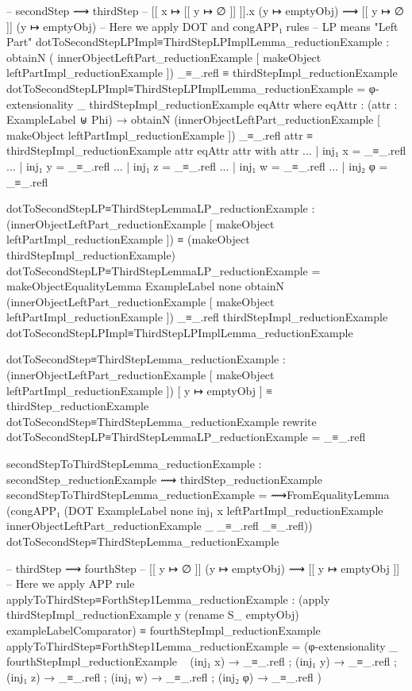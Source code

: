 -- secondStep ⟿ thirdStep
-- [[ x ↦ [[ y ↦ ∅ ]] ]].x (y ↦ emptyObj) ⟿ [[ y ↦ ∅ ]] (y ↦ emptyObj)
-- Here we apply DOT and congAPP₁ rules
-- LP means "Left Part"
dotToSecondStepLPImpl≡ThirdStepLPImplLemma_reductionExample :
  obtainN ( innerObjectLeftPart_reductionExample 
    [ makeObject leftPartImpl_reductionExample ])
  _≡_.refl ≡ thirdStepImpl_reductionExample
dotToSecondStepLPImpl≡ThirdStepLPImplLemma_reductionExample =
  φ-extensionality _ thirdStepImpl_reductionExample eqAttr where
    eqAttr : (attr : ExampleLabel ⊎ Phi)
      → obtainN (innerObjectLeftPart_reductionExample
        [ makeObject leftPartImpl_reductionExample ])
      _≡_.refl attr ≡ thirdStepImpl_reductionExample attr
    eqAttr attr with attr
    ... | inj₁ x = _≡_.refl
    ... | inj₁ y = _≡_.refl
    ... | inj₁ z = _≡_.refl
    ... | inj₁ w = _≡_.refl
    ... | inj₂ φ = _≡_.refl

dotToSecondStepLP≡ThirdStepLemmaLP_reductionExample :
  (innerObjectLeftPart_reductionExample
    [ makeObject leftPartImpl_reductionExample ])
  ≡ (makeObject thirdStepImpl_reductionExample)
dotToSecondStepLP≡ThirdStepLemmaLP_reductionExample =
  makeObjectEqualityLemma
    {ExampleLabel}
    {none}
    {obtainN
      (innerObjectLeftPart_reductionExample [ makeObject leftPartImpl_reductionExample ])
      _≡_.refl}
    {thirdStepImpl_reductionExample}
    dotToSecondStepLPImpl≡ThirdStepLPImplLemma_reductionExample

dotToSecondStep≡ThirdStepLemma_reductionExample :
  (innerObjectLeftPart_reductionExample
    [ makeObject leftPartImpl_reductionExample ])
  [ y ↦ emptyObj ]
  ≡ thirdStep_reductionExample
dotToSecondStep≡ThirdStepLemma_reductionExample
  rewrite dotToSecondStepLP≡ThirdStepLemmaLP_reductionExample = _≡_.refl

secondStepToThirdStepLemma_reductionExample :
  secondStep_reductionExample ⟿ thirdStep_reductionExample
secondStepToThirdStepLemma_reductionExample =
  ⟿FromEqualityLemma (congAPP₁
    (DOT
      {ExampleLabel}
      {none}
      {inj₁ x}
      {leftPartImpl_reductionExample}
      {innerObjectLeftPart_reductionExample}
      {_} {_≡_.refl} {_≡_.refl}))
    dotToSecondStep≡ThirdStepLemma_reductionExample



-- thirdStep ⟿ fourthStep
-- [[ y ↦ ∅ ]] (y ↦ emptyObj) ⟿ [[ y ↦ emptyObj ]]
-- Here we apply APP rule
applyToThirdStep≡ForthStep1Lemma_reductionExample :
  (apply thirdStepImpl_reductionExample y
    (rename S_ emptyObj) exampleLabelComparator)
  ≡ fourthStepImpl_reductionExample
applyToThirdStep≡ForthStep1Lemma_reductionExample =
  (φ-extensionality _ fourthStepImpl_reductionExample \ {
    (inj₁ x) → _≡_.refl ;
    (inj₁ y) → _≡_.refl ;
    (inj₁ z) → _≡_.refl ;
    (inj₁ w) → _≡_.refl ;
    (inj₂ φ) → _≡_.refl })


